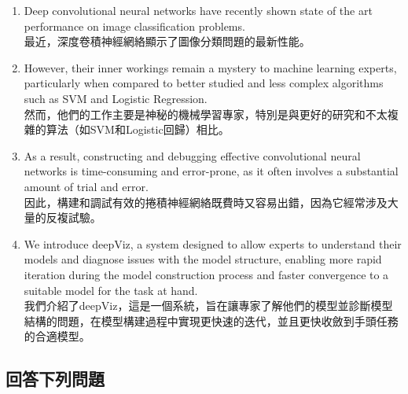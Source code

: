\begin{enumerate}

\item Deep convolutional neural networks have recently shown state of the art performance on image classiﬁcation problems. \\
最近，深度卷積神經網絡顯示了圖像分類問題的最新性能。

\item However, their inner workings remain a mystery to machine learning experts, particularly when compared to better studied and less complex algorithms such as SVM and Logistic Regression. 
\\然而，他們的工作主要是神秘的機械學習專家，特別是與更好的研究和不太複雜的算法（如SVM和Logistic回歸）相比。

\item As a result, constructing and debugging effective convolutional neural networks is time-consuming and error-prone, as it often involves a substantial amount of trial and error. \\
因此，構建和調試有效的捲積神經網絡既費時又容易出錯，因為它經常涉及大量的反複試驗。

\item We introduce deepViz, a system designed to allow experts to understand their models and diagnose issues with the model structure, enabling more rapid iteration during the model construction process and faster convergence to a suitable model for the task at hand.\\
我們介紹了deepViz，這是一個系統，旨在讓專家了解他們的模型並診斷模型結構的問題，在模型構建過程中實現更快速的迭代，並且更快收斂到手頭任務的合適模型。

\end{enumerate}

\subsection{回答下列問題}

